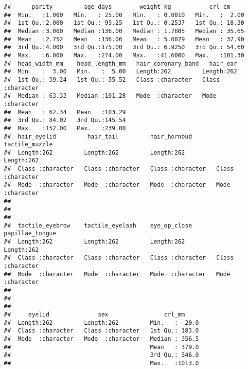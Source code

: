 \documentclass[
]{article}
\begin{document}
\begin{verbatim}
##      parity         age_days        weight_kg           crl_cm      
##  Min.   :1.000   Min.   : 25.00   Min.   : 0.0010   Min.   :  2.00  
##  1st Qu.:2.000   1st Qu.: 95.25   1st Qu.: 0.2537   1st Qu.: 18.30  
##  Median :3.000   Median :136.00   Median : 1.7805   Median : 35.65  
##  Mean   :2.752   Mean   :136.06   Mean   : 5.0029   Mean   : 37.90  
##  3rd Qu.:4.000   3rd Qu.:175.00   3rd Qu.: 6.9250   3rd Qu.: 54.60  
##  Max.   :6.000   Max.   :274.00   Max.   :41.6000   Max.   :101.30  
##  head_width_mm    head_length_mm   hair_coronary_band   hair_ear        
##  Min.   :  3.00   Min.   :  5.00   Length:262         Length:262        
##  1st Qu.: 39.24   1st Qu.: 55.52   Class :character   Class :character  
##  Median : 63.33   Median :101.28   Mode  :character   Mode  :character  
##  Mean   : 62.34   Mean   :103.29                                        
##  3rd Qu.: 84.02   3rd Qu.:145.54                                        
##  Max.   :152.00   Max.   :239.00                                        
##  hair_eyelid         hair_tail         hair_hornbud       tactile_muzzle    
##  Length:262         Length:262         Length:262         Length:262        
##  Class :character   Class :character   Class :character   Class :character  
##  Mode  :character   Mode  :character   Mode  :character   Mode  :character  
##                                                                             
##                                                                             
##                                                                             
##  tactile_eyebrow    tactile_eyelash    eye_op_close       papillae_tongue   
##  Length:262         Length:262         Length:262         Length:262        
##  Class :character   Class :character   Class :character   Class :character  
##  Mode  :character   Mode  :character   Mode  :character   Mode  :character  
##                                                                             
##                                                                             
##                                                                             
##     eyelid              sex                crl_mm      
##  Length:262         Length:262         Min.   :  20.0  
##  Class :character   Class :character   1st Qu.: 183.0  
##  Mode  :character   Mode  :character   Median : 356.5  
##                                        Mean   : 379.0  
##                                        3rd Qu.: 546.0  
##                                        Max.   :1013.0
\end{verbatim}
\end{document}
